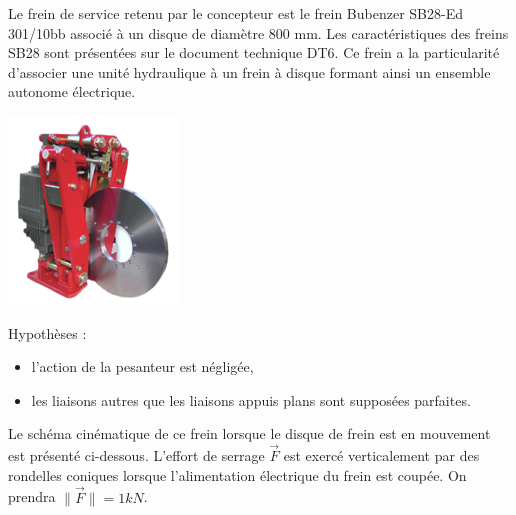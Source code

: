 \begin{minipage}{0.7\linewidth}
Le frein de service retenu par le concepteur est le frein Bubenzer SB28-Ed 301/10bb associé à un disque de diamètre 800 mm. Les caractéristiques des freins SB28 sont présentées sur le document technique DT6. Ce frein a la particularité d'associer une unité hydraulique à un frein à disque formant ainsi un ensemble autonome électrique.
\end{minipage}
\hfill
\begin{minipage}{0.27\linewidth}
 \centering\includegraphics[width=0.9\linewidth]{img/fig17}
\end{minipage}

Hypothèses :
\begin{itemize}
 \item l'action de la pesanteur est négligée,
 \item les liaisons autres que les liaisons appuis plans sont supposées parfaites.
\end{itemize}

Le schéma cinématique de ce frein lorsque le disque de frein est en mouvement est présenté ci-dessous. L'effort de serrage $\overrightarrow{F}$ est exercé verticalement par des rondelles coniques lorsque l'alimentation électrique du frein est coupée. On prendra $\|\overrightarrow{F}\|=1kN$.

